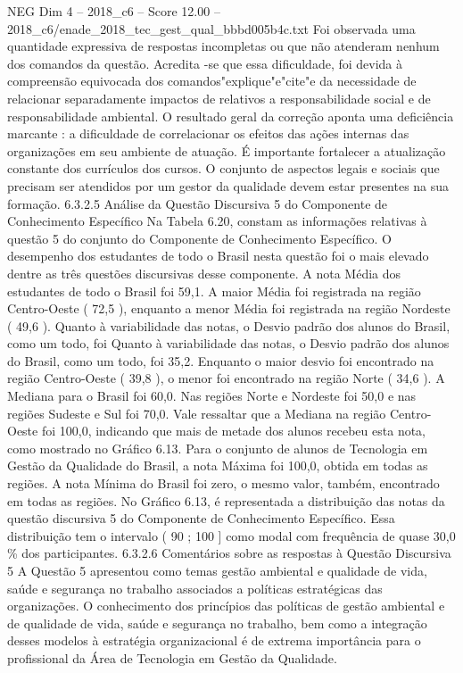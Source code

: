\begin{textsample}{NEG Dim 4 – 2018\_c6 – Score 12.00 – 2018\_c6/enade\_2018\_tec\_gest\_qual\_bbbd005b4c.txt}
Foi observada uma quantidade expressiva de respostas incompletas ou que não atenderam nenhum dos comandos da questão.
Acredita -se que essa dificuldade, foi devida à compreensão equivocada dos comandos"explique"e"cite"e da necessidade de relacionar separadamente impactos de relativos a responsabilidade social e de responsabilidade ambiental.
O resultado geral da correção aponta uma deficiência marcante : a dificuldade de correlacionar os efeitos das ações internas das organizações em seu ambiente de atuação.
É importante fortalecer a atualização constante dos currículos dos cursos.
O conjunto de aspectos legais e sociais que precisam ser atendidos por um gestor da qualidade devem estar presentes na sua formação. 6.3.2.5 Análise da Questão Discursiva 5 do Componente de Conhecimento Específico Na Tabela 6.20, constam as informações relativas à questão 5 do conjunto do Componente de Conhecimento Específico.
O desempenho dos estudantes de todo o Brasil nesta questão foi o mais elevado dentre as três questões discursivas desse componente.
A nota Média dos estudantes de todo o Brasil foi 59,1.
A maior Média foi registrada na região Centro-Oeste ( 72,5 ), enquanto a menor Média foi registrada na região Nordeste ( 49,6 ).
Quanto à variabilidade das notas, o Desvio padrão dos alunos do Brasil, como um todo, foi Quanto à variabilidade das notas, o Desvio padrão dos alunos do Brasil, como um todo, foi 35,2.
Enquanto o maior desvio foi encontrado na região Centro-Oeste ( 39,8 ), o menor foi encontrado na região Norte ( 34,6 ).
A Mediana para o Brasil foi 60,0.
Nas regiões Norte e Nordeste foi 50,0 e nas regiões Sudeste e Sul foi 70,0.
Vale ressaltar que a Mediana na região Centro-Oeste foi 100,0, indicando que mais de metade dos alunos recebeu esta nota, como mostrado no Gráfico 6.13.
Para o conjunto de alunos de Tecnologia em Gestão da Qualidade do Brasil, a nota Máxima foi 100,0, obtida em todas as regiões.
A nota Mínima do Brasil foi zero, o mesmo valor, também, encontrado em todas as regiões.
No Gráfico 6.13, é representada a distribuição das notas da questão discursiva 5 do Componente de Conhecimento Específico.
Essa distribuição tem o intervalo ( 90 ; 100 ] como modal com frequência de quase 30,0 \% dos participantes. 6.3.2.6 Comentários sobre as respostas à Questão Discursiva 5 A Questão 5 apresentou como temas gestão ambiental e qualidade de vida, saúde e segurança no trabalho associados a políticas estratégicas das organizações.
O conhecimento dos princípios das políticas de gestão ambiental e de qualidade de vida, saúde e segurança no trabalho, bem como a integração desses modelos à estratégia organizacional é de extrema importância para o profissional da Área de Tecnologia em Gestão da Qualidade.

\end{textsample}
